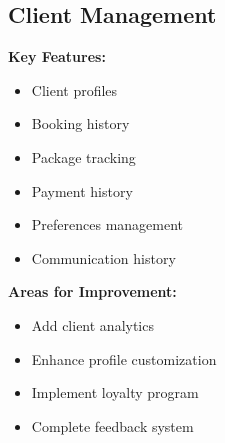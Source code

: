\subsection{Client Management}
\begin{tcolorbox}[
    enhanced,
    title={Client Management: 85\% Complete},
    attach boxed title to top left,
    boxed title style={
        colback=success!50,
        colframe=success!50,
        arc=0mm,
    },
    colback=white,
    colframe=success!50,
    arc=0mm,
    fonttitle=\bfseries
]
    \textbf{Key Features:}
    \begin{itemize}
        \item Client profiles
        \item Booking history
        \item Package tracking
        \item Payment history
        \item Preferences management
        \item Communication history
    \end{itemize}
    
    \textbf{Areas for Improvement:}
    \begin{itemize}
        \item Add client analytics
        \item Enhance profile customization
        \item Implement loyalty program
        \item Complete feedback system
    \end{itemize}
\end{tcolorbox}

